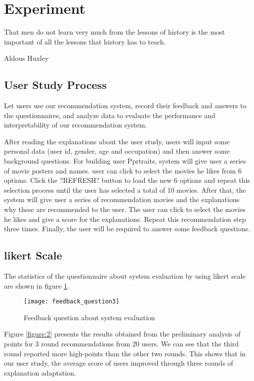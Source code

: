 
\section{Experiment}
\label{ch:experiment}

\epigraph{That men do not learn very much from the lessons of history is the most important of all the lessons that history has to teach.}{Aldous Huxley}

\subsection{User Study Process}
Let users use our recommendation system, record their feedback and answers to the questionnaires, and analyze data to evaluate the performance and interpretability of our recommendation system.
\par After reading the explanations about the user study, users will input some personal data (user id, gender, age and occupation) and then answer some background questions. For building user Pprtraits, system will give user a series of movie posters and names. user can click to select the movies he likes from 6 options. Click the ?REFRESH? button to load the new 6 options and repeat this selection process until the user has selected a total of 10 movies. After that, the system will give user a series of recommendation movies and the explanations why these are recommended to the user. The user can click to select the movies he likes and give a score for the explanations. Repeat this recommendation step three times. Finally, the user will be required to answer some feedback questions.

\subsection{likert Scale}
The statistics of the questionnaire about system evaluation by using likert scale are shown in figure \ref{figure:1}.

\begin{figure}[h]
\caption{Feedback question about system evaluation}
\label{figure:1}
\centering
\texttt{[image: feedback\_question3]}
\end{figure}

Figure \ref{figure:2} presents the results obtained from the preliminary analysis of points for 3 round recommendations from 20 users. We can see that the third round reported more high-points than the other two rounds. This shows that in our user study, the average score of users improved through three rounds of explanation adaptation.

